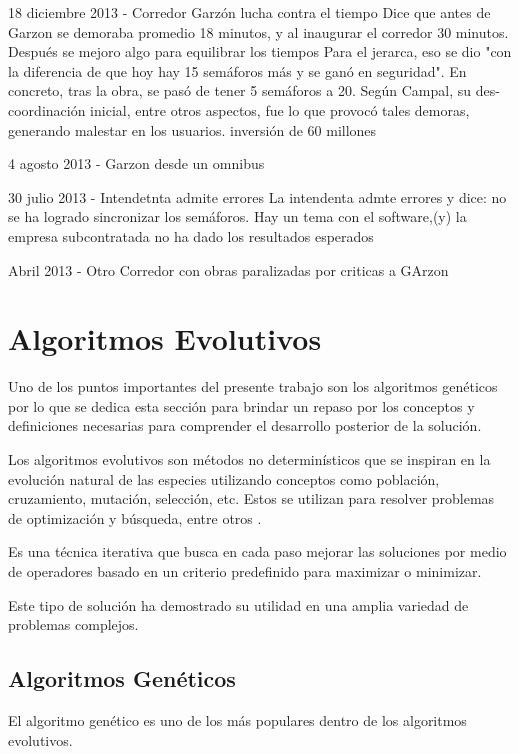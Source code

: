18 diciembre 2013 - Corredor Garzón lucha contra el tiempo %
Dice que antes de Garzon se demoraba promedio 18 minutos, y al inaugurar el corredor 30 minutos. Después se mejoro algo para equilibrar los tiempos
Para el jerarca, eso se dio "con la diferencia de que hoy hay 15 semáforos más y se ganó en seguridad". En concreto, tras la obra, se pasó de tener 5 semáforos a 20. Según Campal, su des-coordinación inicial, entre otros aspectos, fue lo que provocó tales demoras, generando malestar en los usuarios.
inversión de 60 millones


4 agosto 2013 - Garzon desde un omnibus %


30 julio 2013  - Intendetnta admite errores %
La intendenta admte errores y dice: no se ha logrado sincronizar los semáforos. Hay un tema con el software,(y) la empresa subcontratada no ha dado los resultados esperados


Abril 2013 - Otro Corredor con obras paralizadas por criticas a GArzon




\section{Algoritmos Evolutivos}

Uno de los puntos importantes del presente trabajo son los algoritmos genéticos por lo que se dedica esta sección para  brindar un repaso por los conceptos y definiciones necesarias para comprender el desarrollo posterior de la solución.

Los algoritmos evolutivos son métodos no determinísticos que se inspiran en la evolución natural de las especies utilizando conceptos como población, cruzamiento, mutación, selección, etc. Estos se utilizan para resolver problemas de optimización y búsqueda, entre otros \citep{Nesmachnow2002}.

Es una técnica iterativa que busca en cada paso mejorar las soluciones por medio de operadores basado en un criterio predefinido para maximizar o minimizar.

Este tipo de solución ha demostrado su utilidad en una amplia variedad de problemas complejos.


\subsection{Algoritmos Genéticos}
El algoritmo genético es uno de los más populares dentro de los algoritmos evolutivos.

